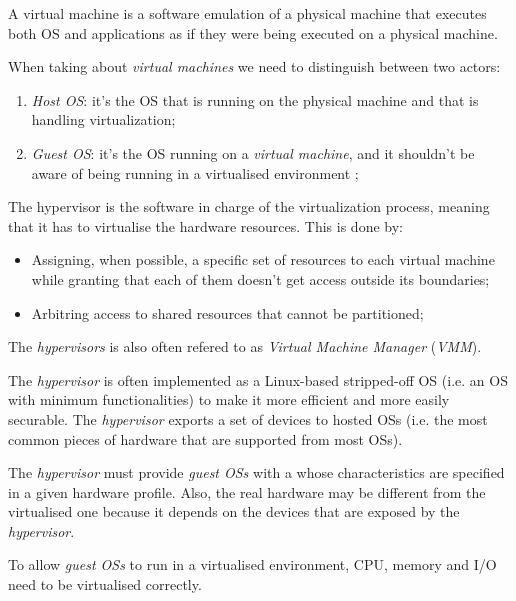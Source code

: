 \begin{definition}
    A virtual machine is a software emulation of a physical machine that executes
    both OS and applications as if they were being executed on a physical machine.
\end{definition}\noindent
When taking about \emph{virtual machines} we need to distinguish between two actors:
\begin{enumerate}
    \item\emph{Host OS}: it's the OS that is running on the physical machine and
    that is handling virtualization;
    \item\emph{Guest OS}: it's the OS running on a \emph{virtual machine}, and it
    shouldn't be aware of being running in a virtualised environment ;
\end{enumerate}

\begin{definition}[Hypervisor]
    The hypervisor is the software in charge of the virtualization process,
    meaning that it has to virtualise the hardware resources. This is done by:
    \begin{itemize}
        \item Assigning, when possible, a specific set of resources to each
        virtual machine while granting that each of them doesn't get access
        outside its boundaries;
        \item Arbitring access to shared resources that cannot be partitioned;
    \end{itemize}
\end{definition}
\begin{note}
    The \emph{hypervisors} is also often refered to as \emph{Virtual Machine
    Manager} (\emph{VMM}).
\end{note}
\noindent
The \emph{hypervisor} is often implemented as a Linux-based stripped-off OS
(i.e. an OS with minimum functionalities) to make it more efficient
and more easily securable. The \emph{hypervisor} exports a set of
 devices to hosted OSs (i.e. the most common pieces of hardware
that are supported from most OSs).

The \emph{hypervisor} must provide \emph{guest OSs} with a 
whose characteristics are specified in a given hardware profile.
Also, the real hardware may be different from the virtualised one because it
depends on the devices that are exposed by the \emph{hypervisor}.

To allow \emph{guest OSs} to run in a virtualised environment, CPU, memory and
I/O need to be virtualised correctly.

